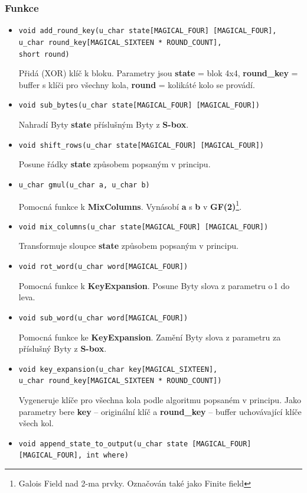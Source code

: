 \documentclass[12pt]{article}
\begin{document}
\subsubsection{Funkce}
\begin{itemize}
	\item \texttt{void add\_round\_key(u\_char state[MAGICAL\_FOUR]
		[MAGICAL\_FOUR],\\
		u\_char round\_key[MAGICAL\_SIXTEEN * ROUND\_COUNT],\\
		short round)}

		Přidá (XOR) klíč k bloku. Parametry jsou
			\textbf{state} = blok 4x4, \textbf{round\_key} = 
			buffer s klíči pro všechny kola, \textbf{round} =
			kolikáté kolo se provádí.
	\item \texttt{void sub\_bytes(u\_char state[MAGICAL\_FOUR]
		[MAGICAL\_FOUR])}

		Nahradí Byty \textbf{state} příslušným Byty z \textbf{S-box}.
	\item \texttt{void shift\_rows(u\_char state[MAGICAL\_FOUR]
		[MAGICAL\_FOUR])}

		Posune řádky \textbf{state} způsobem popsaným v principu.
	\item \texttt{u\_char gmul(u\_char a, u\_char b)}

		Pomocná funkce k \textbf{MixColumns}. Vynásobí \textbf{a} s 
		\textbf{b} v \textbf{GF(2)}\footnote{Galois Field nad 2-ma prvky.
		Označován také jako Finite field}.
	\item \texttt{void mix\_columns(u\_char state[MAGICAL\_FOUR]
		[MAGICAL\_FOUR])}

		Transformuje sloupce \textbf{state} způsobem popsaným v principu.
	\item \texttt{void rot\_word(u\_char word[MAGICAL\_FOUR])}
	
		Pomocná funkce k \textbf{KeyExpansion}. Posune Byty slova z
		parametru o\,1 do leva.
	\item \texttt{void sub\_word(u\_char word[MAGICAL\_FOUR])}

		Pomocná funkce ke \textbf{KeyExpansion}. Zamění Byty slova z
		parametru za\,příslušný Byty z \textbf{S-box}.
	\item \texttt{void key\_expansion(u\_char key[MAGICAL\_SIXTEEN],\\
		u\_char round\_key[MAGICAL\_SIXTEEN * ROUND\_COUNT])}

		Vygeneruje klíče pro všechna kola podle algoritmu popsaném
		v principu. Jako parametry bere \textbf{key} -- originální
		klíč a \textbf{round\_key} -- buffer uchovávající klíče 
		všech kol.
	\sloppy \item \texttt{void append\_state\_to\_output(u\_char state
		[MAGICAL\_FOUR][MAGICAL\_FOUR], int where)}


\end{itemize}
\end{document}
